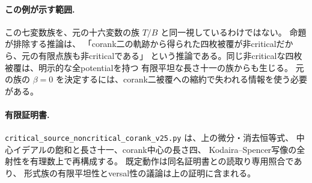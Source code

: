 \paragraph{この例が示す範囲.}
この七変数族を、元の十六変数の族 $T/B$ と同一視しているわけではない。
命題が排除する推論は、
「corank二の軌跡から得られた四枚被覆が非criticalだから、元の有限点族も非criticalである」
という推論である。同じ非criticalな四枚被覆は、明示的な全potentialを持つ
有限平坦な長さ十一の族からも生じる。
元の族の $\beta=0$ を決定するには、corank二被覆への縮約で失われる情報を使う必要がある。

\paragraph{有限証明書.}
\nolinkurl{critical_source_noncritical_corank_v25.py} は、上の微分・消去恒等式、
中心イデアルの飽和と長さ十一、corank中心の長さ四、
Kodaira--Spencer写像の全射性を有理数上で再構成する。
既定動作は同名証明書との読取り専用照合であり、
形式族の有限平坦性とversal性の議論は上の証明に含まれる。
